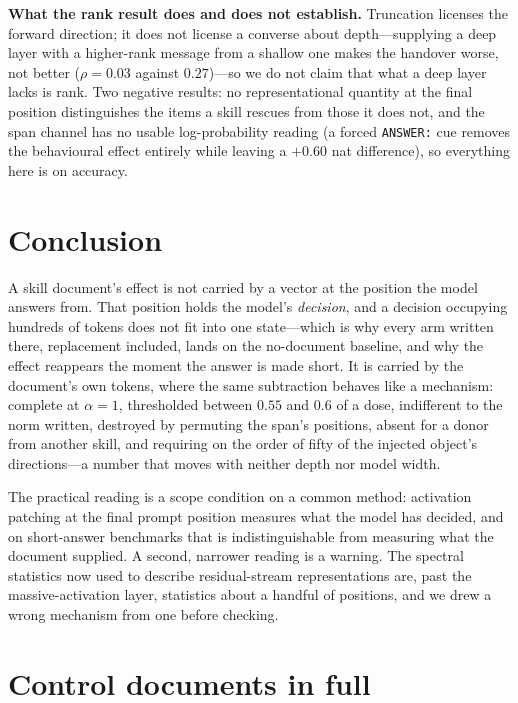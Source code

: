 \documentclass{article}
\begin{document}
\textbf{What the rank result does and does not establish.} Truncation licenses
the forward direction; it does not license a converse about depth---supplying a
deep layer with a higher-rank message from a shallow one makes the handover
worse, not better ($\rho=0.03$ against $0.27$)---so we do not claim that what a
deep layer lacks is rank. Two negative results: no representational quantity at
the final position distinguishes the items a skill rescues from those it does
not, and the span channel has no usable log-probability reading (a forced
\texttt{ANSWER:} cue removes the behavioural effect entirely while leaving a
$+0.60$ nat difference), so everything here is on accuracy.

\section{Conclusion}

A skill document's effect is not carried by a vector at the position the model
answers from. That position holds the model's \emph{decision}, and a decision
occupying hundreds of tokens does not fit into one state---which is why every
arm written there, replacement included, lands on the no-document baseline, and
why the effect reappears the moment the answer is made short. It is carried by
the document's own tokens, where the same subtraction behaves like a mechanism:
complete at $\alpha=1$, thresholded between $0.55$ and $0.6$ of a dose,
indifferent to the norm written, destroyed by permuting the span's positions,
absent for a donor from another skill, and requiring on the order of fifty of
the injected object's directions---a number that moves with neither depth nor
model width.

The practical reading is a scope condition on a common method: activation
patching at the final prompt position measures what the model has decided, and
on short-answer benchmarks that is indistinguishable from measuring what the
document supplied. A second, narrower reading is a warning. The spectral
statistics now used to describe residual-stream representations are, past the
massive-activation layer, statistics about a handful of positions, and we drew a
wrong mechanism from one before checking.

\label{endmain}
\clearpage



\clearpage
\appendix

\section{Control documents in full}
\label{app:controls}
\end{document}
